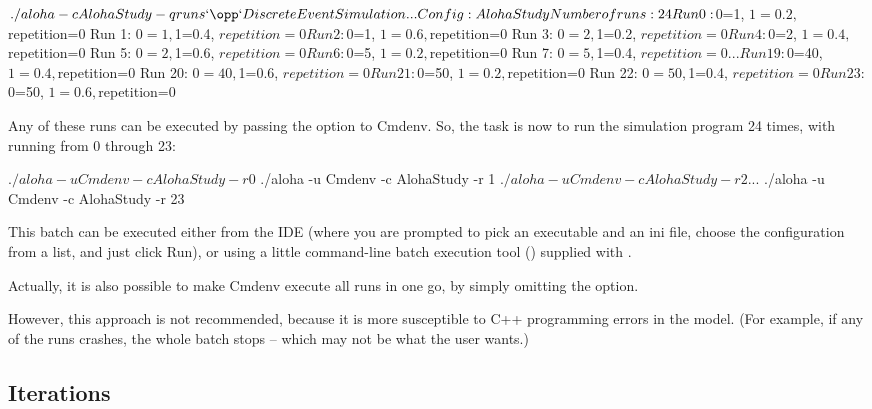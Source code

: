 \begin{commandline}
$ ./aloha -c AlohaStudy -q runs
`\opp` Discrete Event Simulation
...
Config: AlohaStudy
Number of runs: 24
Run 0: $0=1, $1=0.2, $repetition=0
Run 1: $0=1, $1=0.4, $repetition=0
Run 2: $0=1, $1=0.6, $repetition=0
Run 3: $0=2, $1=0.2, $repetition=0
Run 4: $0=2, $1=0.4, $repetition=0
Run 5: $0=2, $1=0.6, $repetition=0
Run 6: $0=5, $1=0.2, $repetition=0
Run 7: $0=5, $1=0.4, $repetition=0
...
Run 19: $0=40, $1=0.4, $repetition=0
Run 20: $0=40, $1=0.6, $repetition=0
Run 21: $0=50, $1=0.2, $repetition=0
Run 22: $0=50, $1=0.4, $repetition=0
Run 23: $0=50, $1=0.6, $repetition=0
\end{commandline}

Any of these runs can be executed by passing the 
option to Cmdenv. So, the task is now to run the simulation program 24
times, with  running from 0 through 23:

\begin{commandline}
$ ./aloha -u Cmdenv -c AlohaStudy -r 0
$ ./aloha -u Cmdenv -c AlohaStudy -r 1
$ ./aloha -u Cmdenv -c AlohaStudy -r 2
...
$ ./aloha -u Cmdenv -c AlohaStudy -r 23
\end{commandline}

This batch can be executed either from the {\opp} IDE (where you are
prompted to pick an executable and an ini file, choose the configuration
from a list, and just click Run), or using a little command-line
batch execution tool () supplied with {\opp}.

Actually, it is also possible to make Cmdenv execute all runs in one go,
by simply omitting the  option.


However, this approach is not recommended, because it is more
susceptible to C++ programming errors in the model. (For example, if
any of the runs crashes, the whole batch stops -- which may
not be what the user wants.)


\subsection{Iterations}
\label{sec:config-sim:iterations}


